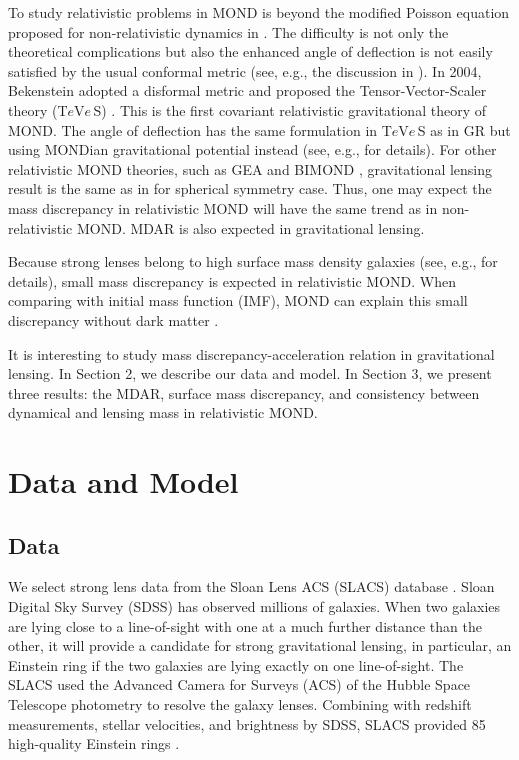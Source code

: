 \documentclass[fleqn,usenatbib,useAMS]{mnras}
\begin{document}
    To study relativistic problems in MOND is beyond the modified Poisson equation proposed for non-relativistic dynamics in \cite{BM84}.
    The difficulty is not only the theoretical complications but also the enhanced angle of deflection is not easily satisfied by the usual conformal metric (see, e.g., the discussion in \cite{BS94}).
    In 2004, Bekenstein adopted a disformal metric and proposed the Tensor-Vector-Scaler theory (T$e$V$e\,$S) \citep{Bekenstein04}.
    This is the first covariant relativistic gravitational theory of MOND.
    The angle of deflection has the same formulation in T$e$V$e\,$S as in GR but using MONDian gravitational potential instead (see, e.g., \cite{Chiu06,Tian13} for details).
    For other relativistic MOND theories, such as GEA \citep{Zlosnik07} and BIMOND \citep{Milgrom09}, gravitational lensing result is the same as in \cite{Chiu06} for spherical symmetry case.
    Thus, one may expect the mass discrepancy in relativistic MOND will have the same trend as in non-relativistic MOND.
    MDAR is also expected in gravitational lensing.

    Because strong lenses belong to high surface mass density galaxies (see, e.g., \cite{Sanders14} for details), small mass discrepancy is expected in relativistic MOND.
    When comparing with initial mass function (IMF), MOND can explain this small discrepancy without dark matter \citep{Chen06,Chiu06,Chiu11,Sanders08,Sanders14}.

    It is interesting to study mass discrepancy-acceleration relation in gravitational lensing.
    In Section 2, we describe our data and model.
    In Section 3, we present three results: the MDAR, surface mass discrepancy, and consistency between dynamical and lensing mass in relativistic MOND.

    \section{Data and Model}

        \subsection{Data}

    We select strong lens data from the Sloan Lens ACS (SLACS) database \citep{Auger09}.
    Sloan Digital Sky Survey (SDSS) has observed millions of galaxies.
    When two galaxies are lying close to a line-of-sight with one at a much further distance than the other, it will provide a candidate for strong gravitational lensing, in particular, an Einstein ring if the two galaxies are lying exactly on one line-of-sight.
    The SLACS used the Advanced Camera for Surveys (ACS) of the Hubble Space Telescope photometry to resolve the galaxy lenses.
    Combining with redshift measurements, stellar velocities, and brightness by SDSS, SLACS provided 85 high-quality Einstein rings \citep{Auger09}.
\end{document}
